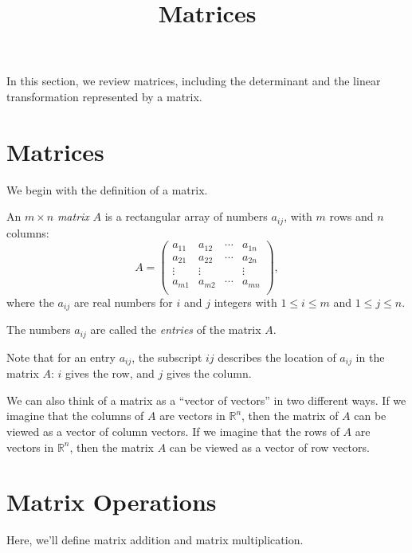 \documentclass{ximera}
\title{Matrices}
\begin{document}
  
\begin{abstract}  
\end{abstract}  
\maketitle 

In this section, we review matrices, including the determinant and the linear transformation represented by a matrix.

\section*{Matrices}

We begin with the definition of a matrix.

\begin{definition}
An $m\times n$ \emph{matrix} $A$ is a rectangular array of numbers $a_{ij}$, with $m$ rows and $n$ columns:
\[
A = \left(\begin{array}{cccc}
a_{11}& a_{12} & \cdots & a_{1n}\\
a_{21}& a_{22} & \cdots & a_{2n}\\
\vdots & \vdots & & \vdots\\
a_{m1}& a_{m2} & \cdots & a_{mn}\\
\end{array}\right), 
\]
where the $a_{ij}$ are real numbers for $i$ and $j$ integers with $1\leq i \leq m$ and $1\leq j\leq n$.

The numbers $a_{ij}$ are called the \emph{entries} of the matrix $A$.
\end{definition}

Note that for an entry $a_{ij}$, the subscript $ij$ describes the location of $a_{ij}$ in the matrix $A$: $i$ gives the row, and $j$ gives the column.

We can also think of a matrix as a ``vector of vectors'' in two different ways. If we imagine that the columns of $A$ are vectors in $\mathbb{R}^n$, then the matrix of $A$ can be viewed as a vector of column vectors. If we imagine that the rows of $A$ are vectors in $\mathbb{R}^n$, then the matrix $A$ can be viewed as a vector of row vectors.

\section*{Matrix Operations}

Here, we'll define matrix addition and matrix multiplication.
\end{document}
